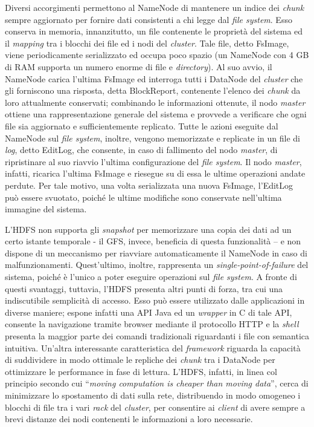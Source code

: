 Diversi accorgimenti permettono al NameNode di mantenere un indice dei \textit{chunk} sempre aggiornato per fornire dati consistenti a chi legge dal \textit{file system}. Esso conserva in memoria, 
innanzitutto, un file contenente le proprietà del sistema ed il \textit{mapping} tra i blocchi dei file ed i nodi del \textit{cluster}. Tale file, detto FsImage, viene periodicamente serializzato 
ed occupa poco spazio (un NameNode con 4 GB di RAM supporta un numero enorme di file e \textit{directory}). Al suo avvio, il NameNode carica l’ultima FsImage ed interroga tutti i DataNode
del \textit{cluster} che gli forniscono una risposta, detta BlockReport, contenente l’elenco dei \textit{chunk} da loro attualmente conservati; combinando le informazioni ottenute, il nodo \textit{master} 
ottiene una rappresentazione generale del sistema e provvede a verificare che ogni file sia aggiornato e sufficientemente replicato. Tutte le azioni eseguite dal NameNode sul 
\textit{file system}, inoltre, vengono memorizzate e replicate in un file di \textit{log}, detto EditLog, che consente, in caso di fallimento del nodo \textit{master}, di ripristinare al suo riavvio l’ultima 
configurazione del \textit{file system}. Il nodo \textit{master}, infatti, ricarica l’ultima FsImage e riesegue su di essa le ultime operazioni andate perdute. Per tale motivo, una volta serializzata
una nuova FsImage, l’EditLog può essere svuotato, poiché le ultime modifiche sono conservate nell’ultima immagine del sistema.

L’HDFS non supporta gli \textit{snapshot} per memorizzare una copia dei dati ad un certo istante temporale - il GFS, invece, beneficia di questa funzionalità – e non dispone di un meccanismo 
per riavviare automaticamente il NameNode in caso di malfunzionamenti. Quest’ultimo, inoltre, rappresenta un \textit{single-point-of-failure} del sistema, poiché è l’unico a poter eseguire 
operazioni sul \textit{file system}. A fronte di questi svantaggi, tuttavia, l’HDFS presenta altri punti di forza, tra cui una indiscutibile semplicità di accesso. Esso può essere utilizzato
dalle applicazioni in diverse maniere; espone infatti una API Java ed un \textit{wrapper} in C di tale API, consente la navigazione tramite browser mediante il protocollo HTTP e la \textit{shell} 
presenta la maggior parte dei comandi tradizionali riguardanti i file con semantica intuitiva. Un’altra interessante caratteristica del \textit{framework} riguarda la capacità di suddividere 
in modo ottimale le repliche dei \textit{chunk} tra i DataNode per ottimizzare le performance in fase di lettura. L’HDFS, infatti, in linea col principio secondo cui “\textit{moving computation 
is cheaper than moving data}”, cerca di minimizzare lo spostamento di dati sulla rete, distribuendo in modo omogeneo i blocchi di file tra i vari \textit{rack} del \textit{cluster}, per consentire 
ai \textit{client} di avere sempre a brevi distanze dei nodi contenenti le informazioni a loro necessarie.


